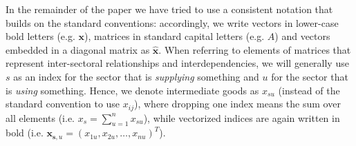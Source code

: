 In the remainder of the paper we have tried to use a consistent notation that builds on the standard conventions: accordingly, we write vectors in lower-case bold letters (e.g. $\mathbf{x}$), matrices in standard capital letters (e.g. $A$) and vectors embedded in a diagonal matrix as $\hat{\mathbf{x}}$. When referring to elements of matrices that represent inter-sectoral relationships and interdependencies, we will generally use $s$ as an index for the sector that is \textit{supplying} something and $u$ for the sector that is \textit{using} something. Hence, we denote intermediate goods as $x_{su}$ (instead of the standard convention to use $x_{ij}$), where dropping one index means the sum over all elements (i.e. $x_s=\sum_{u=1}^n x_{su}$), while vectorized indices are again written in bold (i.e. $\mathbf{x}_{\mathbf{s},u}=(x_{1u},x_{2u}, \dots , x_{nu})^T$).

